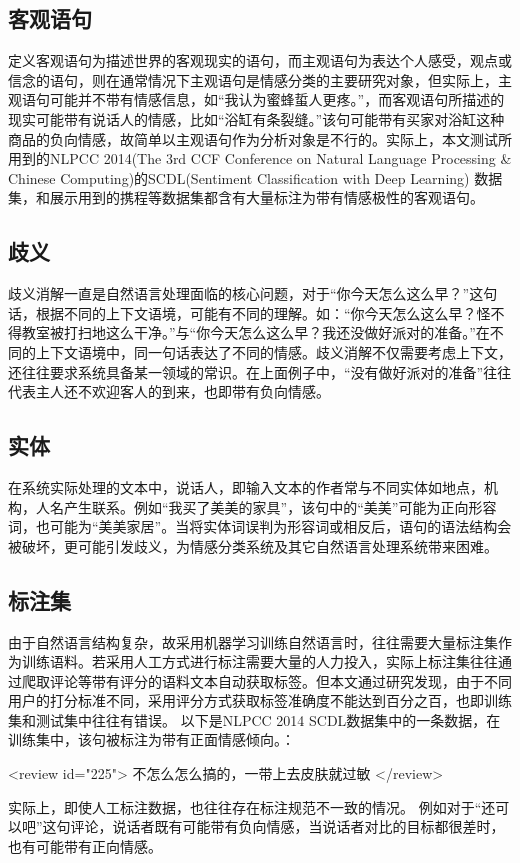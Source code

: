 \subsection{客观语句}
定义客观语句为描述世界的客观现实的语句，而主观语句为表达个人感受，观点或信念的语句\cite{Liu2016}，则在通常情况下主观语句是情感分类的主要研究对象，但实际上，主观语句可能并不带有情感信息，如“我认为蜜蜂蜇人更疼。”，而客观语句所描述的现实可能带有说话人的情感，比如“浴缸有条裂缝。”该句可能带有买家对浴缸这种商品的负向情感，故简单以主观语句作为分析对象是不行的。实际上，本文测试所用到的NLPCC 2014(The 3rd CCF Conference on Natural Language Processing \& Chinese Computing)的SCDL(Sentiment Classification with Deep Learning) 数据集，和展示用到的携程等数据集都含有大量标注为带有情感极性的客观语句。
\subsection{歧义}
歧义消解一直是自然语言处理面临的核心问题，对于“你今天怎么这么早？”这句话，根据不同的上下文语境，可能有不同的理解。如：“你今天怎么这么早？怪不得教室被打扫地这么干净。”与“你今天怎么这么早？我还没做好派对的准备。”在不同的上下文语境中，同一句话表达了不同的情感。歧义消解不仅需要考虑上下文，还往往要求系统具备某一领域的常识。在上面例子中，“没有做好派对的准备”往往代表主人还不欢迎客人的到来，也即带有负向情感。
\subsection{实体}
在系统实际处理的文本中，说话人，即输入文本的作者常与不同实体如地点，机构，人名产生联系。例如“我买了美美的家具”，该句中的“美美”可能为正向形容词，也可能为“美美家居”。当将实体词误判为形容词或相反后，语句的语法结构会被破坏，更可能引发歧义，为情感分类系统及其它自然语言处理系统带来困难。
\subsection{标注集}
由于自然语言结构复杂，故采用机器学习训练自然语言时，往往需要大量标注集作为训练语料。若采用人工方式进行标注需要大量的人力投入，实际上标注集往往通过爬取评论等带有评分的语料文本自动获取标签。但本文通过研究发现，由于不同用户的打分标准不同，采用评分方式获取标签准确度不能达到百分之百，也即训练集和测试集中往往有错误。
以下是NLPCC 2014 SCDL数据集中的一条数据，在训练集中，该句被标注为带有正面情感倾向。：
 
    <review id="225">
        不怎么怎么搞的，一带上去皮肤就过敏
    </review>
   
实际上，即使人工标注数据，也往往存在标注规范不一致的情况。
例如对于“还可以吧”这句评论，说话者既有可能带有负向情感，当说话者对比的目标都很差时，也有可能带有正向情感。
